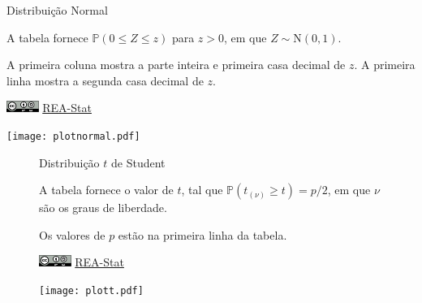 \documentclass[12pt]{article}
\begin{document}
\begin{minipage}[c]{.64\textwidth}

\begin{Huge}
Distribuição Normal
\end{Huge}

\vspace{2em}

A tabela fornece $\mathbb{P}(0 \leq Z \leq z)$ para $z>0$, em que $Z \sim \text{N}(0,1)$.

A primeira coluna mostra a parte inteira e primeira casa decimal de $z$.
A primeira linha mostra a segunda casa decimal de $z$.
\par\bigskip
\href{https://creativecommons.org/licenses/by-sa/4.0/deed.pt_BR}{\includegraphics[height=1em]{cc-by-sa.pdf}}
\href{https://rea-stat.github.io}{REA-Stat}
\end{minipage}
\hfill
\begin{minipage}[c]{.35\textwidth}
\texttt{[image: plotnormal.pdf]}
\end{minipage}




\newpage


\begin{landscape}

\begin{figure}[h]
\begin{minipage}[c]{1\textwidth}

\begin{Huge}
Distribuição $t$ de Student
\end{Huge}

\vspace{2em}

A tabela fornece o valor de $t$, tal que $\mathbb{P}(t_{(\nu)} \geq t) = p/2$, em que $\nu$ são os graus de liberdade.

Os valores de $p$ estão na primeira linha da tabela.
\par\bigskip
\href{https://creativecommons.org/licenses/by-sa/4.0/deed.pt_BR}{\includegraphics[height=1em]{cc-by-sa.pdf}}
\href{https://rea-stat.github.io}{REA-Stat}
\end{minipage}
\hfill
\begin{minipage}[c]{.3\textwidth}
\texttt{[image: plott.pdf]}
\end{minipage}
\end{figure}  



\end{landscape}
\end{document}
